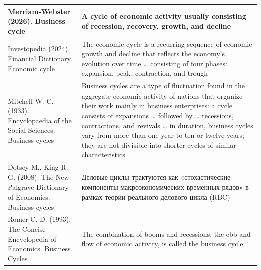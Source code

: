 \begin{longtable}{
    |>{\RaggedRight\arraybackslash}p{}
    |p{}|
    }
    Merriam-Webster (2026). Business cycle\cite{Merriam-Webster-2026}
    &
    A cycle of economic activity usually consisting of recession, recovery, growth, and decline \\ \hline

    Investopedia (2024). Financial Dictionary. Economic cycle\cite{Investopedia-2024}
    &
    The economic cycle is a recurring sequence of economic growth and decline that reflects the economy’s evolution over time … consisting of four phases: expansion, peak, contraction, and trough \\ \hline

    Mitchell W. C. (1933). Encyclopaedia of the Social Sciences. Business cycles\cite{Mitchell-1933}
    &
    Business cycles are a type of fluctuation found in the aggregate economic activity of nations that organize their work mainly in business enterprises: a cycle consists of expansions … followed by … recessions, contractions, and revivals … in duration, business cycles vary from more than one year to ten or twelve years; they are not divisible into shorter cycles of similar characteristics \\ \hline

    Dotsey M., King R. G. (2008). The New Palgrave Dictionary of Economics. Business cycles\cite{Dotsey-2008}
    &
    Деловые циклы трактуются как «стохастические компоненты макроэкономических временных рядов» в рамках теории реального делового цикла (RBC) \\ \hline

    Romer C. D. (1993). The Concise Encyclopedia of Economics. Business Cycles\cite{Romer-1993}
    &
    The combination of booms and recessions, the ebb and flow of economic activity, is called the business cycle \\ \hline
\end{longtable}